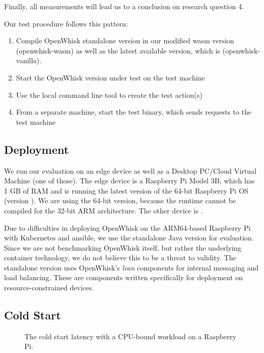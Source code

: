Finally, all measurements will lead us to a conclusion on research question 4.

Our test procedure follows this pattern:

\begin{enumerate}
    \item Compile OpenWhisk standalone version in our modified wasm version (openwhisk-wasm) as well as the latest available version, which is  (openwhisk-vanilla).
    \item Start the OpenWhisk version under test on the test machine
    \item Use the local  command line tool to create the test action(s)
    \item From a separate machine, start the test binary, which sends requests to the test machine
\end{enumerate}

\subsection{Deployment}

We run our evaluation on an edge device as well as a Desktop PC/Cloud Virtual Machine (one of those). The edge device is a Raspberry Pi Model 3B, which has 1 GB of RAM and is running the latest version of the 64-bit Raspberry Pi OS (version ). We are using the 64-bit version, because the  runtime cannot be compiled for the 32-bit ARM architecture. The other device is .

Due to difficulties in deploying OpenWhisk on the ARM64-based Raspberry Pi with Kubernetes and ansible, we use the standalone Java version for evaluation. Since we are not benchmarking OpenWhisk itself, but rather the underlying container technology, we do not believe this to be a threat to validity. The standalone version uses OpenWhisk's \emph{lean} components for internal messaging and load balancing. These are components written specifically for deployment on resource-constrained devices.


\subsection{Cold Start}

\begin{figure}
    \begin{center}
        
    \end{center}
    \caption{The cold start latency with a CPU-bound workload on a Raspberry Pi.}
    \label{fig:pi-cold-start-initTime}
\end{figure}


